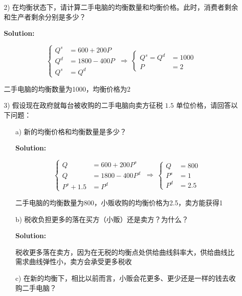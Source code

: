 \documentclass[11pt,a4paper,fleqn]{article}
\begin{document}
\begin{itemize}
	\item[2)]在均衡状态下，请计算二手电脑的均衡数量和均衡价格。此时，消费者剩余和生产者剩余分别是多少？

	\textbf{Solution:}
	
	$$
		\left\{
		\begin{aligned}
			Q^s &= 600+200P  \\
			Q^d &= 1800-400P \\
			Q^s &= Q^d
		\end{aligned}
		\right.
		\ \Longrightarrow\
		\left\{
		\begin{aligned}
			Q^s = Q^d & =1000 \\
			P         & = 2
		\end{aligned}
		\right.
	$$

	二手电脑的均衡数量为1000，均衡价格为2

	\item[3)]假设现在政府就每台被收购的二手电脑向卖方征税 $1.5$  单位价格，请回答以下问题：

	\begin{itemize}

		\item[a)]新的均衡价格和均衡数量是多少？
	
		\textbf{Solution:}
	
        $$
		\left\{
		\begin{aligned}
			Q &= 600+200P^s  \\
			Q &= 1800-400P^d \\
			P^s+1.5 &= P^d
		\end{aligned}
		\right.
		\ \Longrightarrow\
		\left\{
		\begin{aligned}
            Q&=800\\
			P^s  & =1 \\
			P^d   &=2.5 
		\end{aligned}
		\right.
	    $$

	    二手电脑的均衡数量为800，小贩收购的均衡价格为2.5，卖方能获得1
        
		\item[b)]税收负担更多的落在买方（小贩）还是卖方？为什么？

		\textbf{Solution:}
	
        税收更多落在卖方，因为在无税的均衡点处供给曲线斜率大，供给曲线比需求曲线弹性小，卖方会承受更多税收

		\item[c)]在新的均衡下，相比以前而言，小贩会花更多、更少还是一样的钱去收购二手电脑？


\end{itemize}
\end{itemize}
\end{document}
